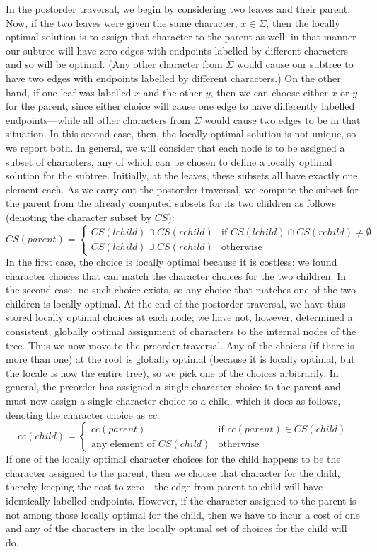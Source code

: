 \documentclass[11pt]{article}
\begin{document}
In the postorder traversal, we begin by considering two leaves and their
parent. Now, if the two leaves were given the same character, $x\in\Sigma$,
then the locally optimal solution is to assign that character to the parent
as well: in that manner our subtree will have zero edges with endpoints
labelled by different characters and so will be optimal.  (Any other character
from $\Sigma$ would cause our subtree to have two edges with endpoints
labelled by different characters.)  On the other hand, if one leaf was
labelled $x$ and the other $y$, then we can choose either $x$ or $y$ for
the parent, since either choice will cause one edge to have differently
labelled endpoints---while all other characters from $\Sigma$ would cause
two edges to be in that situation.  In this second case, then, the locally
optimal solution is not unique, so we report both.  In general, we
will consider that each node is to be assigned a subset of characters,
any of which can be chosen to define a locally optimal solution for the
subtree.  Initially, at the leaves, these subsets all have exactly one
element each.  As we carry out the postorder traversal, we compute the
subset for the parent from the already computed subsets for its two children
as follows (denoting the character subset by $CS$):
  $$CS(parent) = \begin{cases}
		   CS(lchild)\cap CS(rchild) & \text{if\ \ \ }CS(lchild)\cap CS(rchild)\not=\emptyset\\
		   CS(lchild)\cup CS(rchild) & \text{otherwise}
                 \end{cases}$$
In the first case, the choice is locally optimal because it is costless:
we found character choices that can match the character choices for the
two children.  In the second case, no such choice exists, so any choice that
matches one of the two children is locally optimal.  At the end of the
postorder traversal, we have thus stored locally optimal choices at each node;
we have not, however, determined a consistent, globally optimal assignment of
characters to the internal nodes of the tree.  Thus we now move to the preorder
traversal.  Any of the choices (if there is more than one) at the root is
globally optimal (because it is locally optimal, but the locale is now the
entire tree), so we pick one of the choices arbitrarily.  In general, the
preorder has assigned a single character choice to the parent and must
now assign a single character choice to a child, which it does as follows,
denoting the character choice as $cc$:
  $$cc(child) = \begin{cases}
		  cc(parent) & \text{if\ \ \ }cc(parent)\in CS(child)\\
		  \text{any element of }CS(child) & \text{otherwise}
                \end{cases}$$
If one of the locally optimal character choices for the child happens to be
the character assigned to the parent, then we choose that character for the
child, thereby keeping the cost to zero---the edge from parent to child will
have identically labelled endpoints.  However, if the character assigned to
the parent is not among those locally optimal for the child, then we have
to incur a cost of one and any of the characters in the locally optimal
set of choices for the child will do.
\end{document}
